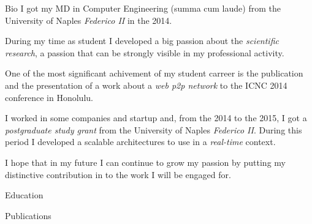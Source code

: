 \documentclass{cv}
\begin{document}
\begin{resume}

  \begin{cvsection}{\faCoffee}{Bio}
    I got my MD in Computer Engineering (summa cum laude) from the University of Naples \emph{Federico II} in the 2014.

    During my time as student I developed a big passion about the \emph{scientific research}, a passion that can be strongly visible in my professional activity.

    One of the most significant achivement of my student carreer is the publication and the presentation of a work about a \emph{web p2p network} to the ICNC 2014 conference in Honolulu.

    I worked in some companies and startup and, from the 2014 to the 2015, I got a \emph{postgraduate study grant} from the University of Naples \emph{Federico II}. During this period I developed a scalable architectures to use in a \emph{real-time} context.
    
    I hope that in my future I can continue to grow my passion by putting my distinctive contribution in to the work I will be engaged for.
  \end{cvsection}

  \begin{cvsection}{\faGraduationCap}{Education}
  \end{cvsection}

  \begin{cvsection}{\faBook}{Publications}
  \end{cvsection}


\end{resume}
\end{document}
